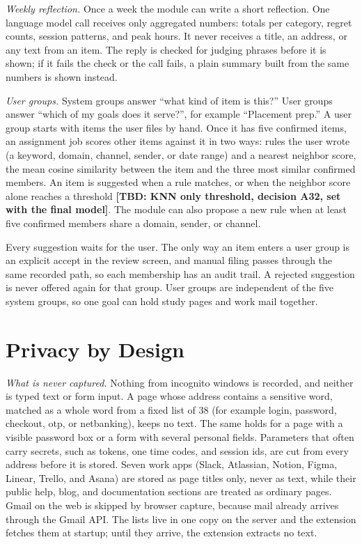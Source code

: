 \documentclass[conference]{IEEEtran}
\newcommand{\tbd}[1]{\textbf{[TBD: #1]}}
\begin{document}
\textit{Weekly reflection.} Once a week the module can write a short reflection. One language model call receives only aggregated numbers: totals per category, regret counts, session patterns, and peak hours. It never receives a title, an address, or any text from an item. The reply is checked for judging phrases before it is shown; if it fails the check or the call fails, a plain summary built from the same numbers is shown instead.

\textit{User groups.} System groups answer ``what kind of item is this?'' User groups answer ``which of my goals does it serve?'', for example ``Placement prep.'' A user group starts with items the user files by hand. Once it has five confirmed items, an assignment job scores other items against it in two ways: rules the user wrote (a keyword, domain, channel, sender, or date range) and a nearest neighbor score, the mean cosine similarity between the item and the three most similar confirmed members. An item is suggested when a rule matches, or when the neighbor score alone reaches a threshold \tbd{KNN only threshold, decision A32, set with the final model}. The module can also propose a new rule when at least five confirmed members share a domain, sender, or channel.

Every suggestion waits for the user. The only way an item enters a user group is an explicit accept in the review screen, and manual filing passes through the same recorded path, so each membership has an audit trail. A rejected suggestion is never offered again for that group. User groups are independent of the five system groups, so one goal can hold study pages and work mail together.

\section{Privacy by Design}\label{sec:privacy}
\textit{What is never captured.} Nothing from incognito windows is recorded, and neither is typed text or form input. A page whose address contains a sensitive word, matched as a whole word from a fixed list of 38 (for example login, password, checkout, otp, or netbanking), keeps no text. The same holds for a page with a visible password box or a form with several personal fields. Parameters that often carry secrets, such as tokens, one time codes, and session ids, are cut from every address before it is stored. Seven work apps (Slack, Atlassian, Notion, Figma, Linear, Trello, and Asana) are stored as page titles only, never as text, while their public help, blog, and documentation sections are treated as ordinary pages. Gmail on the web is skipped by browser capture, because mail already arrives through the Gmail API. The lists live in one copy on the server and the extension fetches them at startup; until they arrive, the extension extracts no text.
\end{document}
